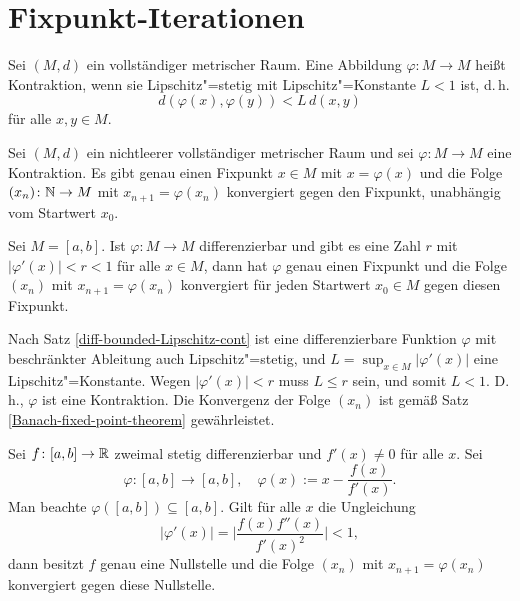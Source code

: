 \newpage
\section{Fixpunkt-Iterationen}%

\begin{Definition}[Kontraktion]
Sei $(M,d)$ ein vollständiger metrischer Raum. Eine Abbildung
$\varphi\colon M\to M$ heißt Kontraktion, wenn sie
Lipschitz"=stetig mit Lipschitz"=Konstante $L<1$ ist, d.\,h.
\[d(\varphi(x),\varphi(y))<L\,d(x,y)\]
für alle $x,y\in M$.
\end{Definition}

\begin{Satz}\label{Banach-fixed-point-theorem}%
Sei $(M,d)$ ein nichtleerer vollständiger metrischer Raum
und sei $\varphi\colon M\to M$ eine Kontraktion. Es gibt genau
einen Fixpunkt $x\in M$ mit $x=\varphi(x)$ und die Folge
$(x_n)\colon\mathbb N\to M$ mit $x_{n+1}=\varphi(x_n)$ konvergiert
gegen den Fixpunkt, unabhängig vom Startwert $x_0$.
\end{Satz}

\begin{Satz}\label{diff-fixed-point-iter}
Sei $M=[a,b]$. Ist $\varphi\colon M\to M$ differenzierbar und gibt es
eine Zahl $r$ mit $|\varphi'(x)|<r<1$ für alle $x\in M$, dann
hat $\varphi$ genau einen Fixpunkt und die Folge $(x_n)$ mit $x_{n+1}=\varphi(x_n)$
konvergiert für jeden Startwert $x_0\in M$ gegen diesen Fixpunkt.
\end{Satz}
\begin{Beweis}
Nach Satz \ref{diff-bounded-Lipschitz-cont} ist eine differenzierbare
Funktion $\varphi$ mit beschränkter Ableitung auch Lipschitz"=stetig,
und $L=\sup_{x\in M}|\varphi'(x)|$ eine Lipschitz"=Konstante.
Wegen $|\varphi'(x)|<r$ muss $L\le r$ sein, und somit $L<1$.
D.\,h., $\varphi$ ist eine Kontraktion. Die Konvergenz der Folge
$(x_n)$ ist gemäß Satz \ref{Banach-fixed-point-theorem}
gewährleistet.\;\qedsymbol
\end{Beweis}

\begin{Satz}%
\newlinefirst
Sei $f\colon [a,b]\to\mathbb R$ zweimal stetig differenzierbar und
$f'(x)\ne 0$ für alle $x$. Sei%
\[\varphi\colon [a,b]\to [a,b],\quad \varphi(x):=x-\frac{f(x)}{f'(x)}.\]
Man beachte $\varphi([a,b])\subseteq [a,b]$. Gilt für alle $x$ die Ungleichung%
\[|\varphi'(x)| = \bigg|\frac{f(x)f''(x)}{f'(x)^2}\bigg| < 1,\]
dann besitzt $f$ genau eine Nullstelle und die Folge $(x_n)$ mit
$x_{n+1}=\varphi(x_n)$ konvergiert gegen diese Nullstelle.
\end{Satz}

